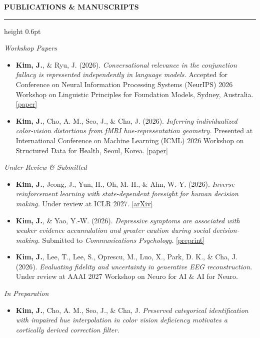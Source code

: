 \documentclass[11pt]{article}
\newcommand{\cvsection}[1]{%
  \needspace{4\baselineskip}%
  \vspace{0.70em}
  {\large\bfseries\MakeUppercase{#1}}\par
  \vspace{0.15em}\hrule height 0.6pt \vspace{0.30em}
}
\begin{document}
\cvsection{Publications \& Manuscripts}
\textit{Workshop Papers}\par\vspace{0.1em}
\begin{itemize}[itemsep=0.54em]
  \item \textbf{Kim, J.}, \& Ryu, J. (2026). \textit{Conversational relevance in the conjunction fallacy is represented independently in language models.} Accepted for Conference on Neural Information Processing Systems (NeurIPS) 2026 Workshop on Linguistic Principles for Foundation Models, Sydney, Australia. \href{https://openreview.net/forum?id=aVWJk84zeg}{[paper]}
  \item \textbf{Kim, J.}, Cho, A. M., Seo, J., \& Cha, J. (2026). \textit{Inferring individualized color-vision distortions from fMRI hue-representation geometry.} Presented at International Conference on Machine Learning (ICML) 2026 Workshop on Structured Data for Health, Seoul, Korea. \href{https://openreview.net/forum?id=YSptfeekLI}{[paper]}
\end{itemize}
\vspace{0.45em}
\textit{Under Review \& Submitted}\par\vspace{0.1em}
\begin{itemize}[itemsep=0.54em]
  \item \textbf{Kim, J.}, Jeong, J., Yun, H., Oh, M.-H., \& Ahn, W.-Y. (2026). \textit{Inverse reinforcement learning with state-dependent foresight for human decision making.} Under review at ICLR 2027. \href{https://arxiv.org/abs/2611.34351}{[arXiv]}
  \item \textbf{Kim, J.}, \& Yao, Y.-W. (2026). \textit{Depressive symptoms are associated with weaker evidence accumulation and greater caution during social decision-making.} Submitted to \textit{Communications Psychology}. \href{https://osf.io/preprints/psyarxiv/npv9f}{[preprint]}
  \item \textbf{Kim, J.}, Lee, T., Lee, S., Oprescu, M., Luo, X., Park, D. K., \& Cha, J. (2026). \textit{Evaluating fidelity and uncertainty in generative EEG reconstruction.} Under review at AAAI 2027 Workshop on Neuro for AI \& AI for Neuro.
\end{itemize}
\vspace{0.45em}
\textit{In Preparation}\par\vspace{0.1em}
\begin{itemize}[itemsep=0.54em]
  \item \textbf{Kim, J.}, Cho, A. M., Seo, J., \& Cha, J. \textit{Preserved categorical identification with impaired hue interpolation in color vision deficiency motivates a cortically derived correction filter.}
\end{itemize}
\end{document}
